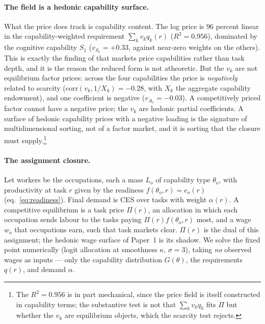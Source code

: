 \paragraph{The field is a hedonic capability surface.}
What the price does track is capability content. The log price is $96$ percent
linear in the capability-weighted requirement $\sum_k v_k q_k(r)$
($R^2 = 0.956$), dominated by the cognitive capability $S_1$
($v_{S_1} = +0.33$, against near-zero weights on the others). This is exactly
the finding of \textcite{storck2026geometry} that markets price capabilities
rather than task depth, and it is the reason the reduced form is not atheoretic.
But the $v_k$ are not equilibrium factor prices: across the four capabilities the
price is \emph{negatively} related to scarcity ($\mathrm{corr}(v_k, 1/X_k) =
-0.28$, with $X_k$ the aggregate capability endowment), and one coefficient is
negative ($v_{A_1} = -0.03$). A competitively priced factor cannot have a
negative price; the $v_k$ are hedonic partial coefficients. A surface of hedonic
capability prices with a negative loading is the signature of multidimensional
sorting, not of a factor market, and it is sorting that the closure must
supply.\footnote{The $R^2 = 0.956$ is in part mechanical, since the price field
is itself constructed in capability terms; the substantive test is not that
$\sum_k v_k q_k$ fits $\Pi$ but whether the $v_k$ are equilibrium objects, which
the scarcity test rejects.}

\paragraph{The assignment closure.}
Let workers be the occupations, each a mass $L_o$ of capability type $\theta_o$,
with productivity at task $r$ given by the readiness $f(\theta_o,r) = e_o(r)$
(eq.~\ref{eq:readiness}). Final demand is CES over tasks with weight $\alpha(r)$.
A competitive equilibrium is a task price $\Pi(r)$, an allocation in which each
occupation sends labour to the tasks paying $\Pi(r) f(\theta_o,r)$ most, and a
wage $w_o$ that occupations earn, such that task markets clear. $\Pi(r)$ is the
dual of this assignment; the hedonic wage surface of Paper~1 is its shadow. We
solve the fixed point numerically (logit allocation at smoothness $\kappa$,
$\sigma = 3$), taking \emph{no} observed wages as inputs --- only the capability
distribution $G(\theta)$, the requirements $q(r)$, and demand $\alpha$.

